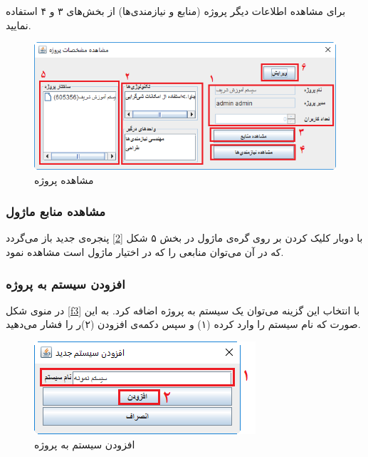برای مشاهده اطلاعات دیگر پروژه (منابع و نیازمندی‌ها) از بخش‌های ۳ و ۴ استفاده نمایید.
\begin{figure}[H]
	\centering
	\includegraphics[scale=0.8]{img/manual/projectAttr}
	\caption{مشاهده پروژه}
	\label{f2}
	\end{figure}	


\subsubsection{مشاهده منابع ماژول}
با دوبار کلیک کردن بر روی گره‌ی ماژول در بخش ۵ شکل
\ref{2}
پنجره‌ی جدید باز می‌گردد که در آن می‌توان منابعی را که در اختیار ماژول است مشاهده نمود.


\subsubsection{افزودن سیستم به پروژه}
در منوی شکل
\ref{f3}
با انتخاب این گزینه می‌توان یک سیستم به پروژه اضافه کرد. به این صورت که نام سیستم را وارد کرده (۱) و سپس دکمه‌ی افزودن  (۲)ر را فشار می‌دهید.
\begin{figure}[H]
	\centering
	\includegraphics[scale=0.8]{img/manual/addSys}
	\caption{افزودن سیستم به پروژه}
\end{figure}

